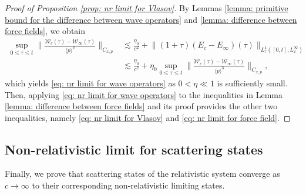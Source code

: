 \documentclass[reqno, 11pt, letterpaper]{amsart}
\theoremstyle{remark}
\numberwithin{equation}{section}
\numberwithin{theorem}{section}
\numberwithin{table}{section}
\numberwithin{figure}{section}
\begin{document}
\begin{proof}[Proof of Proposition \ref{prop: nr limit for Vlasov}]
By Lemmas \ref{lemma: primitive bound for the difference between wave operators} and \ref{lemma: difference between force fields}, we obtain
$$\begin{aligned}
\sup_{0\leq \tau\leq t}\bigg\|\frac{\mathcal{W}_c(\tau)-\mathcal{W}_\infty(\tau)}{\langle p\rangle^3}\bigg\|_{C_{x,p}}&\lesssim \frac{\eta_0}{c^2}+\big\|(1+\tau)(E_c-E_\infty)(\tau)\big\|_{L_{\tau}^1([0,t]; L_x^\infty)}\\
&\lesssim \frac{\eta_0}{c^2}+\eta_0\sup_{0\leq \tau\leq t}\bigg\|\frac{\mathcal{W}_c(\tau)-\mathcal{W}_\infty(\tau)}{\langle p\rangle^3}\bigg\|_{C_{x,p}},
\end{aligned}$$
which yields \eqref{eq: nr limit for wave operators} as $0<\eta \ll 1$ is  sufficiently small. Then, applying \eqref{eq: nr limit for wave operators} to the inequalities in Lemma \ref{lemma: difference between force fields} and its proof provides the other two inequalities, namely \eqref{eq: nr limit for Vlasov} and \eqref{eq: nr limit for force field}.
\end{proof}


\subsection{Non-relativistic limit for scattering states}

Finally, we prove that scattering states of the relativistic system converge as $c \to \infty$ to their corresponding non-relativistic limiting states.
\end{document}

